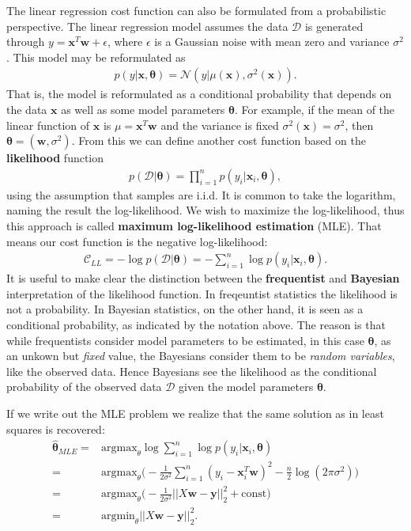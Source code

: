 \documentclass[twoside,english]{uiofysmaster}
\begin{document}
The linear regression cost function can also be formulated from a probabilistic perspective.
The linear regression model assumes the data $\mathcal{D}$ is generated through $y = \mathbf{x}^T \mathbf{w} + \epsilon$, where $\epsilon$ is a Gaussian noise with mean zero and variance $\sigma^2$. This model may be reformulated as
\begin{align}
	p(y|\mathbf{x}, \bm{\theta}) = \mathcal{N} (y| \mu(\bm{x}), \sigma^2(\bm{x})).
\end{align}
That is, the model is reformulated as a conditional probability that depends on the data $\bm{x}$ as well as some model parameters $\bm{\theta}$. For example, if the mean of the linear function of $\bm{x}$ is $\mu = \bm{x}^T \bm{w}$ and the variance is fixed $\sigma^2(\bm{x}) = \sigma^2$, then $\bm{\theta} = (\bm{w}, \sigma^2)$.
From this we can define another cost function based on the \textbf{likelihood} function
\begin{align}
	p(\mathcal{D} | \bm{\theta}) = \prod_{i = 1}^n p(y_i | \bm{x}_i , \bm{\theta}),
\end{align}
using the assumption that samples are i.i.d. It is common to take the logarithm, naming the result the log-likelihood. We wish to maximize the log-likelihood, thus this approach is called \textbf{maximum log-likelihood estimation} (MLE). That means our cost function is the negative log-likelihood:
\begin{align}
	\mathcal{C}_{LL} = - \log p(\mathcal{D} | \bm{\theta}) = - \sum_{i = 1}^n \log p(y_i | \bm{x}_i , \bm{\theta}).
\end{align}
It is useful to make clear the distinction between the \textbf{frequentist} and \textbf{Bayesian} interpretation of the likelihood function. In freqeuntist statistics the likelihood is not a probability. In Bayesian statistics, on the other hand, it is seen as a conditional probability, as indicated by the notation above. The reason is that while frequentists consider model parameters to be estimated, in this case $\bm{\theta}$, as an unkown but \textit{fixed} value, the Bayesians consider them to be \textit{random variables}, like the observed data. Hence Bayesians see the likelihood as the conditional probability of the observed data $\mathcal{D}$ given the model parameters $\bm{\theta}$.

If we write out the MLE problem we realize that the same solution as in least squares is recovered:
\begin{align}
	\hat{\bm{\theta}}_{MLE} =& \text{argmax}_\theta \log \sum_{i = 1}^n \log p(y_i | \bm{x}_i , \bm{\theta}) \\
	=& \text{argmax}_\theta \Big (  - \frac{1}{2\sigma^2} \sum_{i=1}^n (y_i - \bm{x}_i^T \bm{w})^2 - \frac{n}{2} \log (2\pi \sigma^2) \Big ) \\
	=& \text{argmax}_\theta \Big ( - \frac{1}{2 \sigma^2} ||X \bm{w} - \bm{y}||_2^2 + \text{const} \Big ) \\
	=& \text{argmin}_\theta ||X\mathbf{w} - \mathbf{y}||_2^2 . \\
\end{align}
\end{document}

